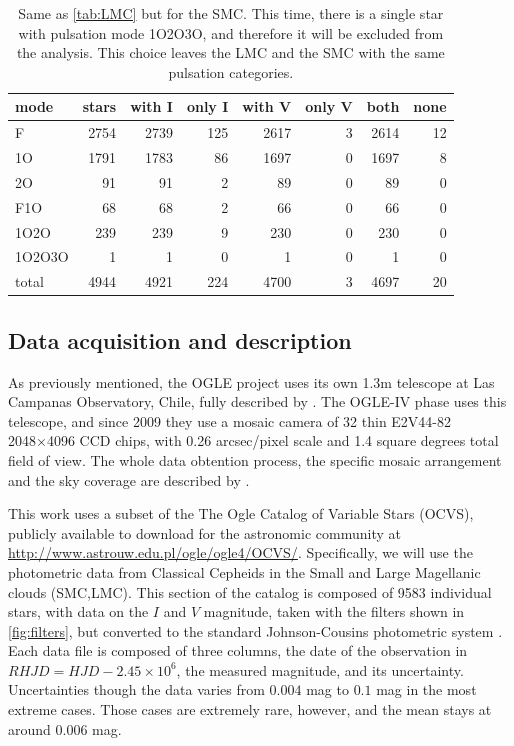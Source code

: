 \begin{table}
	\centering
	\begin{tabular}{l|rrrrrrr}
		mode &     stars &  with I & only I & with V & only V & both &  none \\ \hline\hline
		F      &  2754 &  2739 &       125 &  2617 &         3 &  2614 &    12 \\
		1O     &  1791 &  1783 &        86 &  1697 &         0 &  1697 &     8 \\
		2O     &    91 &    91 &         2 &    89 &         0 &    89 &     0 \\
		F1O    &    68 &    68 &         2 &    66 &         0 &    66 &     0 \\
		1O2O   &   239 &   239 &         9 &   230 &         0 &   230 &     0 \\
		1O2O3O &     1 &     1 &         0 &     1 &         0 &     1 &     0 \\\hline
		total  &  4944 &  4921 &       224 &  4700 &         3 &  4697 &    20 \\
	\end{tabular}
	\caption[Pulsation mode and filter data distribution for the LMC]{
		Same as \autoref{tab:LMC} but for the SMC. 
		This time, there is a single star with pulsation mode 1O2O3O,
		and therefore it will be excluded from the analysis.
		This choice leaves the LMC and the SMC with the same pulsation categories.
	}
	\label{tab:SMC}
\end{table}

\subsection{Data acquisition and description \label{sec:data}}


As previously mentioned, the OGLE project uses its own 1.3m telescope at Las Campanas Observatory, Chile,
fully described by \cite{OGLEIIinstrumentation}. 
The OGLE-IV phase uses this telescope, and since 2009 they use a mosaic camera of 32 thin E2V44-82 2048×4096 CCD chips,
with 0.26 arcsec/pixel scale and 1.4 square degrees total field of view.
The whole data obtention process, the specific mosaic arrangement and the sky coverage are described by \cite{OGLE2015}.


This work uses a subset of the The Ogle Catalog of Variable Stars (OCVS), publicly available to download for the 
astronomic community at \url{http://www.astrouw.edu.pl/ogle/ogle4/OCVS/}.
Specifically, we will use the photometric data from Classical Cepheids in the Small and Large Magellanic clouds (SMC,LMC).
This section of the catalog is composed of 9583 individual stars, with data on the $I$ and $V$ magnitude, 
taken with the filters shown in \autoref{fig:filters}, but converted to the standard Johnson-Cousins photometric system \citep{OGLE2015}.
Each data file is composed of three columns, the date of the observation in $RHJD=HJD-2.45\times 10^6$, 
the measured magnitude, and its uncertainty. 
Uncertainties though the data varies from $0.004$ mag to $0.1$ mag in the most extreme cases. 
Those cases are extremely rare, however, and the mean stays at around $0.006$ mag.


